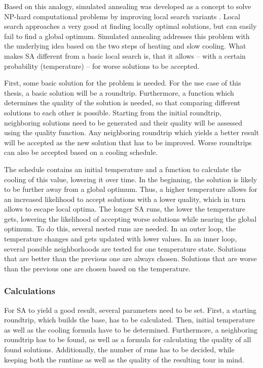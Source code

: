 Based on this analogy, simulated annealing was developed as a concept to solve NP-hard computational problems by improving local search variants \cite{aarts_simulated_2005, eglese_simulated_1990}.
Local search approaches a very good at finding locally optimal solutions, but can easily fail to find a global optimum.
Simulated annealing addresses this problem with the underlying idea based on the two steps of heating and slow cooling.
What makes SA different from a basic local search is, that it allows -- with a certain probability (temperature) -- for worse solutions to be accepted.

First, some basic solution for the problem is needed.
For the use case of this thesis, a basic solution will be a roundtrip.
Furthermore, a function which determines the quality of the solution is needed, so that comparing different solutions to each other is possible. 
Starting from the initial roundtrip, neighboring solutions need to be generated and their quality will be assessed using the quality function.
Any neighboring roundtrip which yields a better result will be accepted as the new solution that has to be improved.
Worse roundtrips can also be accepted based on a cooling schedule.

The schedule contains an initial temperature and a function to calculate the cooling of this value, lowering it over time.
In the beginning, the solution is likely to be further away from a global optimum.
Thus, a higher temperature allows for an increased likelihood to accept solutions with a lower quality, which in turn allows to escape local optima.
The longer SA runs, the lower the temperature gets, lowering the likelihood of accepting worse solutions while nearing the global optimum. 
To do this, several nested runs are needed.
In an outer loop, the temperature changes and gets updated with lower values.
In an inner loop, several possible neighborhoods are tested for one temperature state. 
Solutions that are better than the previous one are always chosen.
Solutions that are worse than the previous one are chosen based on the temperature.


\subsubsection{Calculations}
\label{subsubsec:SACalculations}

For SA to yield a good result, several parameters need to be set. 
First, a starting roundtrip, which builds the base, has to be calculated.
Then, initial temperature as well as the cooling formula have to be determined.
Furthermore, a neighboring roundtrip has to be found, as well as a formula for calculating the quality of all found solutions.
Additionally, the number of runs has to be decided, while keeping both the runtime as well as the quality of the resulting tour in mind.


